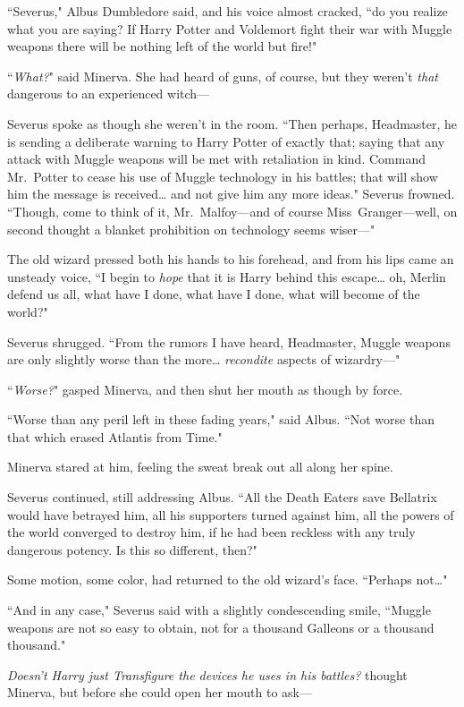 ``Severus," Albus Dumbledore said, and his voice almost cracked, ``do you realize what you are saying? If Harry Potter and Voldemort fight their war with Muggle weapons there will be nothing left of the world but fire!"

``\emph{What?}" said Minerva. She had heard of guns, of course, but they weren't \emph{that} dangerous to an experienced witch—

Severus spoke as though she weren't in the room. ``Then perhaps, Headmaster, he is sending a deliberate warning to Harry Potter of exactly that; saying that any attack with Muggle weapons will be met with retaliation in kind. Command Mr.~Potter to cease his use of Muggle technology in his battles; that will show him the message is received{\ldots} and not give him any more ideas." Severus frowned. ``Though, come to think of it, Mr.~Malfoy—and of course Miss~Granger—well, on second thought a blanket prohibition on technology seems wiser—"

The old wizard pressed both his hands to his forehead, and from his lips came an unsteady voice, ``I begin to \emph{hope} that it is Harry behind this escape{\ldots} oh, Merlin defend us all, what have I done, what have I done, what will become of the world?"

Severus shrugged. ``From the rumors I have heard, Headmaster, Muggle weapons are only slightly worse than the more{\ldots} \emph{recondite} aspects of wizardry—"

``\emph{Worse?}" gasped Minerva, and then shut her mouth as though by force.

``Worse than any peril left in these fading years," said Albus. ``Not worse than that which erased Atlantis from Time."

Minerva stared at him, feeling the sweat break out all along her spine.

Severus continued, still addressing Albus. ``All the Death Eaters save Bellatrix would have betrayed him, all his supporters turned against him, all the powers of the world converged to destroy him, if he had been reckless with any truly dangerous potency. Is this so different, then?"

Some motion, some color, had returned to the old wizard's face. ``Perhaps not{\ldots}"

``And in any case," Severus said with a slightly condescending smile, ``Muggle weapons are not so easy to obtain, not for a thousand Galleons or a thousand thousand."

\emph{Doesn't Harry just Transfigure the devices he uses in his battles?} thought Minerva, but before she could open her mouth to ask—

